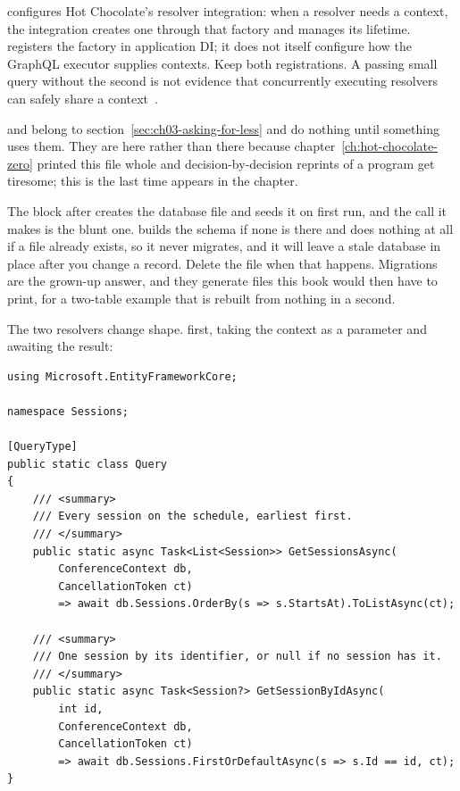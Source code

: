  configures Hot Chocolate's resolver
integration: when a resolver needs a context, the integration creates one
through that factory and manages its lifetime. 
registers the factory in application DI; it does not itself configure how
the GraphQL executor supplies contexts. Keep both registrations. A passing
small query without the second is not evidence that concurrently executing
resolvers can safely share a context~\autocite{hcefcontextrepair}.

%
%
 and  belong to
section~\ref{sec:ch03-asking-for-less} and do nothing until something uses
them. They are here rather than there because
chapter~\ref{ch:hot-chocolate-zero} printed this file whole and
decision-by-decision reprints of a program get tiresome; this is the last time
 appears in the chapter.

%
The block after  creates the database file and seeds it on first
run, and the call it makes is the blunt one.  builds the
schema if none is there and does nothing at all if a file already exists, so
it never migrates, and it will leave a stale database in place after you
change a record. Delete the file when that happens. Migrations are the
grown-up answer, and they generate files this book would then have to print,
for a two-table example that is rebuilt from nothing in a second.

%
The two resolvers change shape.  first, taking the context as a
parameter and awaiting the result:

\begin{verbatim}
using Microsoft.EntityFrameworkCore;

namespace Sessions;

[QueryType]
public static class Query
{
    /// <summary>
    /// Every session on the schedule, earliest first.
    /// </summary>
    public static async Task<List<Session>> GetSessionsAsync(
        ConferenceContext db,
        CancellationToken ct)
        => await db.Sessions.OrderBy(s => s.StartsAt).ToListAsync(ct);

    /// <summary>
    /// One session by its identifier, or null if no session has it.
    /// </summary>
    public static async Task<Session?> GetSessionByIdAsync(
        int id,
        ConferenceContext db,
        CancellationToken ct)
        => await db.Sessions.FirstOrDefaultAsync(s => s.Id == id, ct);
}
\end{verbatim}

